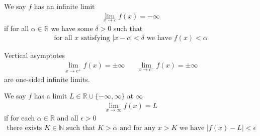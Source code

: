 \begin{definition}
We say $f$ has an infinite limit 
\begin{align*}
    \lim_{x \longrightarrow c} f(x) = -\infty
\end{align*}
if for all $\alpha \in \mathbb{R}$ we have some $\delta > 0$ such that
\begin{align*}
    \text{for all} \hspace{4pt} x \hspace{4pt} \text{satisfying} \hspace{4pt} \lvert x - c \rvert < \delta \hspace{4pt} \text{we have} \hspace{4pt} f(x) < \alpha
\end{align*}
\end{definition}

\begin{recall}
Vertical asymptotes
\begin{align*}
    \lim_{x \longrightarrow c^{+}} f(x) = \pm\infty \hspace{20pt} \lim_{x \longrightarrow c^{-}} f(x) = \pm\infty 
\end{align*}
are one-sided infinite limits.
\end{recall}

\begin{definition}
We say $f$ has a limit $L \in \mathbb{R} \cup \{-\infty, \infty\}$ at $\infty$ 
\begin{align*}
    \lim_{x \longrightarrow \infty} f(x) = L
\end{align*}
if for each $\alpha \in \mathbb{R}$ and all $\epsilon > 0$ 
\begin{align*}
    \text{there exists} \hspace{4pt} K \in \mathbb{N} \hspace{4pt} \text{such that} \hspace{4pt} K > \alpha \hspace{4pt} \text{and for any} \hspace{4pt} x > K \hspace{4pt} \text{we have} \hspace{4pt} \lvert f(x) - L \rvert < \epsilon
\end{align*}
\end{definition}

